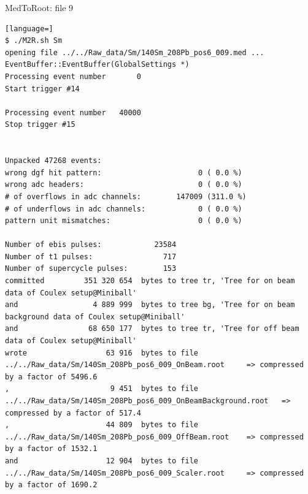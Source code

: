 \documentclass[twoside,english]{uiofysmaster/uiofysmaster}
\begin{document}
MedToRoot: file 9
\begin{lstlisting}[language=] 
$ ./M2R.sh Sm
opening file ../../Raw_data/Sm/140Sm_208Pb_pos6_009.med ...
EventBuffer::EventBuffer(GlobalSettings *)
Processing event number       0
Start trigger #14

Processing event number   40000
Stop trigger #15


Unpacked 47268 events:
wrong dgf hit pattern:                      0 ( 0.0 %)
wrong adc headers:                          0 ( 0.0 %)
# of overflows in adc channels:        147009 (311.0 %)
# of underflows in adc channels:            0 ( 0.0 %)
pattern unit mismatches:                    0 ( 0.0 %)

Number of ebis pulses:            23584
Number of t1 pulses:                717
Number of supercycle pulses:        153
committed         351 320 654  bytes to tree tr, 'Tree for on beam data of Coulex setup@Miniball'
and                 4 889 999  bytes to tree bg, 'Tree for on beam background data of Coulex setup@Miniball'
and                68 650 177  bytes to tree tr, 'Tree for off beam data of Coulex setup@Miniball'
wrote                  63 916  bytes to file ../../Raw_data/Sm/140Sm_208Pb_pos6_009_OnBeam.root 	=> compressed by a factor of 5496.6
,                       9 451  bytes to file ../../Raw_data/Sm/140Sm_208Pb_pos6_009_OnBeamBackground.root 	=> compressed by a factor of 517.4
,                      44 809  bytes to file ../../Raw_data/Sm/140Sm_208Pb_pos6_009_OffBeam.root 	=> compressed by a factor of 1532.1
and                    12 904  bytes to file ../../Raw_data/Sm/140Sm_208Pb_pos6_009_Scaler.root 	=> compressed by a factor of 1690.2
\end{lstlisting}
\end{document}
